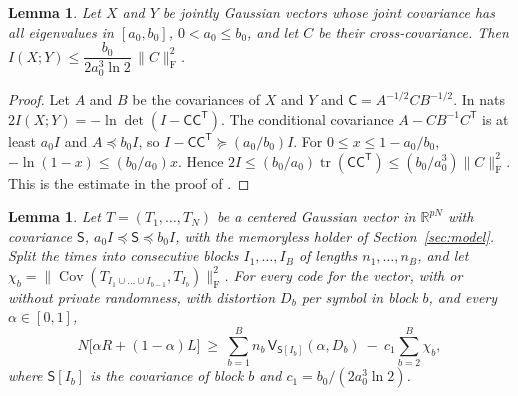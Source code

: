 \documentclass[11pt,onecolumn]{IEEEtran}
\newtheorem{lemma}[theorem]{Lemma}
\newcommand{\R}{\mathbb{R}}
\newcommand{\tr}{\operatorname{tr}}
\newcommand{\Cov}{\operatorname{Cov}}
\newcommand{\fro}{\mathrm F}
\begin{document}
\begin{lemma}\label{lem:cut}
Let $X$ and $Y$ be jointly Gaussian vectors whose joint covariance has
all eigenvalues in $[a_0,b_0]$, $0<a_0\le b_0$, and let $C$ be their
cross-covariance. Then
$I(X;Y)\le\dfrac{b_0}{2a_0^3\ln2}\,\|C\|_{\fro}^2$.
\end{lemma}

\begin{proof}
Let $A$ and $B$ be the covariances of $X$ and $Y$ and
$\mathsf C=A^{-1/2}CB^{-1/2}$. In nats
$2I(X;Y)=-\ln\det(I-\mathsf C\mathsf C^{\mathsf T})$. The conditional
covariance $A-CB^{-1}C^{\mathsf T}$ is at least $a_0I$ and
$A\preceq b_0I$, so $I-\mathsf C\mathsf C^{\mathsf T}\succeq(a_0/b_0)I$. For
$0\le x\le1-a_0/b_0$, $-\ln(1-x)\le(b_0/a_0)x$. Hence
$2I\le(b_0/a_0)\tr(\mathsf C\mathsf C^{\mathsf T})\le(b_0/a_0^3)\|C\|_{\fro}^2$.
This is the estimate in the proof of \cite[Lemma~14]{part2}.
\end{proof}

\begin{lemma}\label{lem:blocks}
Let $T=(T_1,\dots,T_N)$ be a centered Gaussian vector in $\R^{pN}$ with
covariance $\mathsf S$, $a_0I\preceq\mathsf S\preceq b_0I$, with the
memoryless holder of Section~\ref{sec:model}. Split the times into
consecutive blocks $I_1,\dots,I_B$ of lengths $n_1,\dots,n_B$, and let
$\chi_b=\|\Cov(T_{I_1\cup\dots\cup I_{b-1}},T_{I_b})\|_{\fro}^2$. For
every code for the vector, with or without private randomness, with
distortion $D_b$ per symbol in block $b$, and every $\alpha\in[0,1]$,
\[
N\bigl[\alpha R+(1-\alpha)L\bigr]\ \ge\ \sum_{b=1}^Bn_b\,\mathsf V_{\mathsf S[I_b]}(\alpha,D_b)\ -\ c_1\sum_{b=2}^B\chi_b ,
\]
where $\mathsf S[I_b]$ is the covariance of block $b$ and
$c_1=b_0/(2a_0^3\ln2)$.
\end{lemma}
\end{document}
